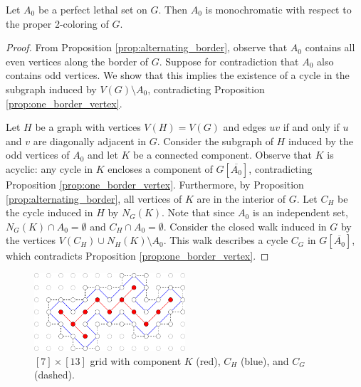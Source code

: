 \begin{lem}
Let $A_0$ be a perfect lethal set on $G$. Then $A_0$ is monochromatic with respect to the proper 2-coloring of $G$.
\end{lem}

\begin{proof}
From Proposition \ref{prop:alternating_border}, observe that $A_0$ contains all even vertices along the border of $G$. Suppose for contradiction that $A_0$ also contains odd vertices. We show that this implies the existence of a cycle in the subgraph induced by $V(G) \setminus A_0$, contradicting Proposition \ref{prop:one_border_vertex}. 

Let $H$ be a graph with vertices $V(H) = V(G)$ and edges $uv$ if and only if $u$ and $v$ are diagonally adjacent in $G$. Consider the subgraph of $H$ induced by the odd vertices of $A_0$ and let $K$ be a connected component. Observe that $K$ is acyclic: any cycle in $K$ encloses a component of $G[\overline{A_0}]$, contradicting Proposition \ref{prop:one_border_vertex}. Furthermore, by Proposition \ref{prop:alternating_border}, all vertices of $K$ are in the interior of $G$. Let $C_H$ be the cycle induced in $H$ by $N_G(K)$. Note that since $A_0$ is an independent set, $N_G(K) \cap A_0 = \emptyset$ and $C_H \cap A_0 = \emptyset$. Consider the closed walk induced in $G$ by the vertices $V(C_H) \cup N_H(K) \setminus A_0$. This walk describes a cycle $C_G$ in $G[\overline{A_0}]$, which contradicts Proposition \ref{prop:one_border_vertex}.
 \end{proof}

\begin{figure}[]
\centering
\includegraphics[width=0.5\textwidth]{figures/6/monochromatic.pdf}
\caption{$[7] \times [13]$ grid with component $K$ (red), $C_H$ (blue), and $C_G$ (dashed).}
\label{fig:border}
\end{figure} 

